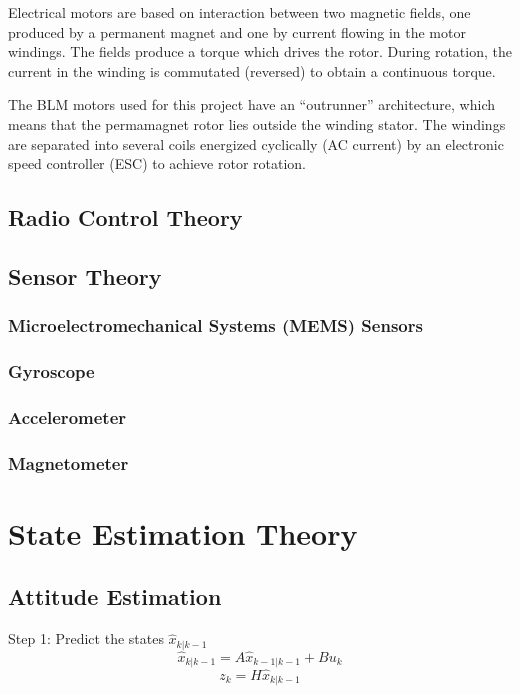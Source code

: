 \documentclass[a4paper]{report}
\begin{document}
Electrical motors are based on interaction between two magnetic fields, one produced by a permanent magnet and one by current flowing in the motor windings. The fields produce a torque which drives the rotor. During rotation, the current in the winding is commutated (reversed) to obtain a continuous torque.

The BLM motors used for this project have an “outrunner” architecture, which means that the permamagnet rotor lies outside the winding stator. The windings are separated into several coils energized cyclically (AC current) by an electronic speed controller (ESC) to achieve rotor rotation.

	\section{Radio Control Theory}

	\section{Sensor Theory}

		\subsection{Microelectromechanical Systems (MEMS) Sensors}

		\subsection{Gyroscope}

		\subsection{Accelerometer}

		\subsection{Magnetometer}

\chapter{State Estimation Theory}

	\section{Attitude Estimation}

		Step 1: Predict the states $\hat{x}_{k|k-1}$
		\begin{equation}
		\hat{x}_{k|k-1}=A\hat{x}_{k-1|k-1}+Bu_{k}
		\end{equation}
		\begin{equation*}
		z_{k}=H\hat{x}_{k|k-1}
		\end{equation*}
\end{document}
